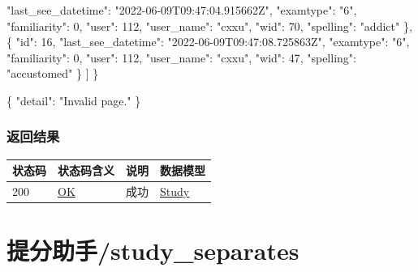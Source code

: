 \documentclass[
]{article}
\newenvironment{Shaded}{}{}
\newcommand{\DataTypeTok}[1]{\textcolor[rgb]{0.56,0.13,0.00}{#1}}
\newcommand{\DecValTok}[1]{\textcolor[rgb]{0.25,0.63,0.44}{#1}}
\newcommand{\FunctionTok}[1]{\textcolor[rgb]{0.02,0.16,0.49}{#1}}
\newcommand{\OtherTok}[1]{\textcolor[rgb]{0.00,0.44,0.13}{#1}}
\newcommand{\StringTok}[1]{\textcolor[rgb]{0.25,0.44,0.63}{#1}}
\begin{document}
\begin{Shaded}
\begin{Highlighting}[]
      \DataTypeTok{"last\_see\_datetime"}\FunctionTok{:} \StringTok{"2022{-}06{-}09T09:47:04.915662Z"}\FunctionTok{,}
      \DataTypeTok{"examtype"}\FunctionTok{:} \StringTok{"6"}\FunctionTok{,}
      \DataTypeTok{"familiarity"}\FunctionTok{:} \DecValTok{0}\FunctionTok{,}
      \DataTypeTok{"user"}\FunctionTok{:} \DecValTok{112}\FunctionTok{,}
      \DataTypeTok{"user\_name"}\FunctionTok{:} \StringTok{"cxxu"}\FunctionTok{,}
      \DataTypeTok{"wid"}\FunctionTok{:} \DecValTok{70}\FunctionTok{,}
      \DataTypeTok{"spelling"}\FunctionTok{:} \StringTok{"addict"}
    \FunctionTok{\}}\OtherTok{,}
    \FunctionTok{\{}
      \DataTypeTok{"id"}\FunctionTok{:} \DecValTok{16}\FunctionTok{,}
      \DataTypeTok{"last\_see\_datetime"}\FunctionTok{:} \StringTok{"2022{-}06{-}09T09:47:08.725863Z"}\FunctionTok{,}
      \DataTypeTok{"examtype"}\FunctionTok{:} \StringTok{"6"}\FunctionTok{,}
      \DataTypeTok{"familiarity"}\FunctionTok{:} \DecValTok{0}\FunctionTok{,}
      \DataTypeTok{"user"}\FunctionTok{:} \DecValTok{112}\FunctionTok{,}
      \DataTypeTok{"user\_name"}\FunctionTok{:} \StringTok{"cxxu"}\FunctionTok{,}
      \DataTypeTok{"wid"}\FunctionTok{:} \DecValTok{47}\FunctionTok{,}
      \DataTypeTok{"spelling"}\FunctionTok{:} \StringTok{"accustomed"}
    \FunctionTok{\}}
  \OtherTok{]}
\FunctionTok{\}}
\end{Highlighting}
\end{Shaded}

\begin{Shaded}
\begin{Highlighting}[]
\FunctionTok{\{}
  \DataTypeTok{"detail"}\FunctionTok{:} \StringTok{"Invalid page."}
\FunctionTok{\}}
\end{Highlighting}
\end{Shaded}

\hypertarget{ux8fd4ux56deux7ed3ux679c-12}{%
\subsubsection{返回结果}\label{ux8fd4ux56deux7ed3ux679c-12}}

\begin{longtable}[]{@{}llll@{}}
\toprule
状态码 & 状态码含义 & 说明 & 数据模型 \\
\midrule
\endhead
200 & \href{https://tools.ietf.org/html/rfc7231\#section-6.3.1}{OK} &
成功 & \protect\hyperlink{schemastudy}{Study} \\
\bottomrule
\end{longtable}

\hypertarget{ux63d0ux5206ux52a9ux624bstudyseparates}{%
\section{提分助手/study\_separates}\label{ux63d0ux5206ux52a9ux624bstudyseparates}}
\end{document}
